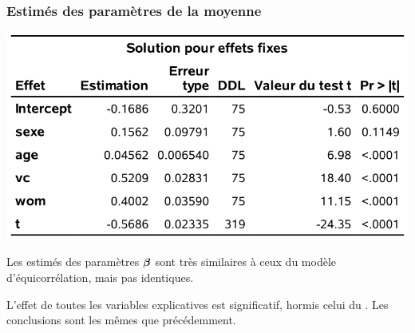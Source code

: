 \documentclass{beamer}
\begin{document}
\begin{frame}[fragile]
\frametitle{Estimés des paramètres de la moyenne}
\begin{center}
\includegraphics[width = 0.7\linewidth]{img/c5/diapos6-e17}
\end{center}
\bi
\item Les estimés des paramètres $\boldsymbol {\beta}$ sont très similaires à ceux du modèle d'équicorrélation, mais pas identiques. 
\item L'effet de toutes les variables explicatives est significatif, hormis celui du . Les conclusions sont les mêmes que précédemment.
\ei
\end{frame}
\end{document}
